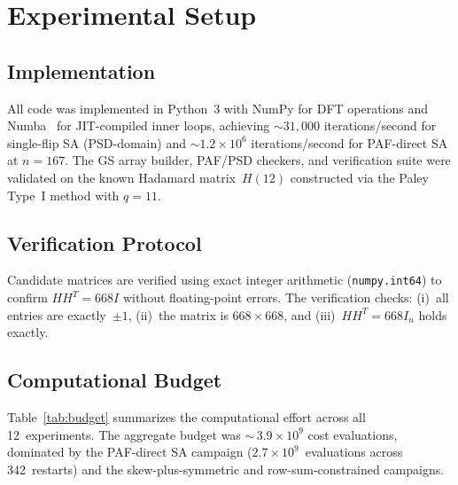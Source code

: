 \documentclass[11pt,a4paper]{article}
\begin{document}
\section{Experimental Setup}\label{sec:setup}

\subsection{Implementation}

All code was implemented in Python~3 with NumPy for DFT operations and
Numba~\cite{lam2015numba} for JIT-compiled inner loops, achieving
$\sim\!31{,}000$ iterations/second for single-flip SA (PSD-domain) and
$\sim\!1.2 \times 10^6$ iterations/second for PAF-direct SA at $n = 167$.
The GS array builder, PAF/PSD checkers, and verification suite were
validated on the known Hadamard matrix~$H(12)$ constructed via the Paley
Type~I method with $q = 11$.

\subsection{Verification Protocol}

Candidate matrices are verified using exact integer arithmetic
(\texttt{numpy.int64}) to confirm $HH^T = 668I$ without floating-point
errors.  The verification checks: (i)~all entries are exactly~$\pm1$,
(ii)~the matrix is $668 \times 668$, and (iii)~$HH^T = 668I_n$ holds
exactly.

\subsection{Computational Budget}

Table~\ref{tab:budget} summarizes the computational effort across all
12~experiments.  The aggregate budget was ${\sim}\,3.9 \times 10^9$ cost
evaluations, dominated by the PAF-direct SA campaign
($2.7 \times 10^9$~evaluations across 342~restarts) and the
skew-plus-symmetric and row-sum-constrained campaigns.
\end{document}
